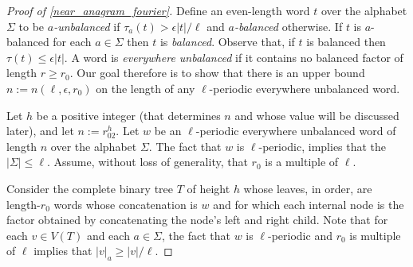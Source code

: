 \documentclass{patmorin}
\begin{document}
\begin{proof}[Proof of \cref{near_anagram_fourier}]
    Define an even-length word $t$ over the alphabet $\Sigma$ to be \emph{$a$-unbalanced} if $\tau_a(t)>\epsilon|t|/\ell$ and \emph{$a$-balanced} otherwise.  If $t$ is $a$-balanced for each $a\in\Sigma$ then $t$ is \emph{balanced}. Observe that, if $t$ is balanced then $\tau(t)\le \epsilon|t|$. A word is \emph{everywhere unbalanced} if it contains no balanced factor of length $r\ge r_0$. Our goal therefore is to show that there is an upper bound $n:=n(\ell,\epsilon,r_0)$ on the length of any $\ell$-periodic everywhere unbalanced word.

    Let $h$ be a positive integer (that determines $n$ and whose value will be discussed later), and let $n:=r_02^{h}$. Let $w$ be an $\ell$-periodic everywhere unbalanced word of length $n$ over the alphabet $\Sigma$.  The fact that $w$ is $\ell$-periodic, implies that the $|\Sigma|\le\ell$.  Assume, without loss of generality, that $r_0$ is a multiple of $\ell$.

    Consider the complete binary tree $T$ of height $h$ whose leaves, in order, are length-$r_0$ words whose concatenation is $w$ and for which each internal node is the factor obtained by concatenating the node's left and right child.
    Note that for each $v\in V(T)$ and each $a\in\Sigma$, the fact that $w$ is $\ell$-periodic and $r_0$ is multiple of $\ell$ implies that $|v|_{a}\ge |v|/\ell$.





\end{proof}
\end{document}
